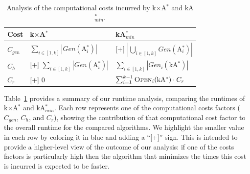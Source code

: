 \documentclass{aicom2e}
\newcommand{\kgs}{$k$GP}
\newcommand{\kastar}{kA$^*$}
\newcommand{\kastarmin}{kA$^*_{min}$}
\newcommand{\kxastar}{k$\times$A$^*$}
\newcommand{\astari}[1]{A$^*_#1$}
\newcommand{\newcode}[1]{{\color{blue}[+] #1}}
\newcommand{\open}{\textsc{Open}}
\begin{document}
\begin{table}
	\begin{tabular}{|l|l|l|}
		\hline
		Cost        & \kxastar{}                                    & \kastarmin \\ \hline
		$C_{gen}$   & $\sum\limits_{i\in[1,k]} |Gen(\text{\astari{i}})|$       & \newcode{$|\bigcup\limits_{i\in[1,k]} Gen(\text{\astari{i}})|$}\\
		$C_{h}$     & \newcode{$\sum\limits_{i\in[1,k]} |Gen(\text{\astari{i}})|$}    & $\sum\limits_{i\in[1,k]} |Gen_i(\text{\kastar{}})|$\\
		$C_r$       & \newcode{0}                                               & $\sum_{i=1}^{k-1} \open{}_i(\text{\kastar{}}) \cdot C_r$\\
		\hline
	\end{tabular}
	\caption{Analysis of the computational costs incurred by \kxastar{} and \kastarmin{}.}
	\label{tab:time-analysis}
\end{table}


Table~\ref{tab:time-analysis} provides a summary of our runtime analysis, comparing the
runtimes of \kxastar{} and \kastarmin{}. Each row represents one of the
computational costs factors ($C_{gen}$, $C_{h}$, and $C_{r}$), showing the
contribution of that computational cost factor to the overall runtime for the
compared algorithms. 
We highlight the smaller value in each row by coloring it in blue and adding a ``[+]'' sign. This is intended to provide a higher-level view of the outcome of our analysis: if one of the costs factors is particularly high then the algorithm that minimizes the times this cost is incurred is expected to be faster. %
\end{document}
